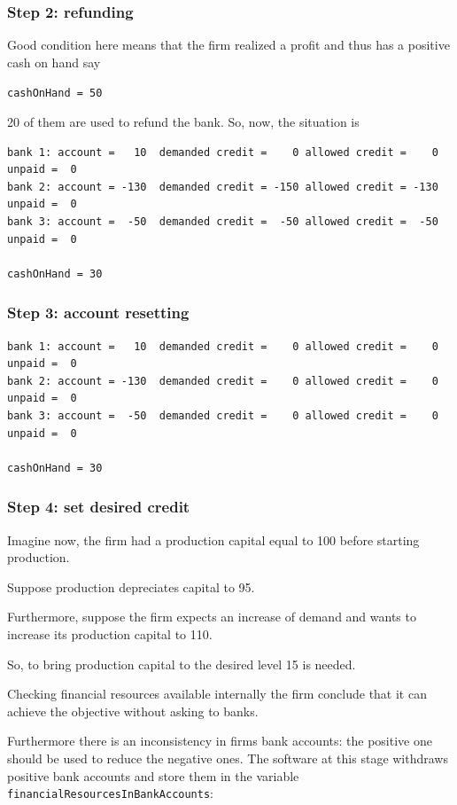 \documentclass{article}
\begin{document}
	\subsubsection*{Step 2: refunding}
	Good condition here means that the firm realized a profit and thus has a positive cash on hand say

	\verb+cashOnHand = 50+

20 of them are used to refund the bank. So, now, the situation is 

\begin{verbatim}
bank 1: account =   10  demanded credit =    0 allowed credit =    0 unpaid =  0
bank 2: account = -130  demanded credit = -150 allowed credit = -130 unpaid =  0
bank 3: account =  -50  demanded credit =  -50 allowed credit =  -50 unpaid =  0

cashOnHand = 30
\end{verbatim}



	\subsubsection*{Step 3: account resetting}

\begin{verbatim}
bank 1: account =   10  demanded credit =    0 allowed credit =    0 unpaid =  0
bank 2: account = -130  demanded credit =    0 allowed credit =    0 unpaid =  0
bank 3: account =  -50  demanded credit =    0 allowed credit =    0 unpaid =  0

cashOnHand = 30
\end{verbatim}

	\subsubsection*{Step 4: set desired credit}
	Imagine now, the firm had a production capital equal to 100 before starting production. 
	
	Suppose production depreciates capital to 95.

	Furthermore, suppose the firm expects an increase of demand and wants to increase its production capital to 110.

	So, to bring production capital to the desired level 15 is needed.

	Checking financial resources available internally the firm conclude that it can achieve the objective without asking to banks. 

	Furthermore there is an inconsistency in firms bank accounts: the positive one should be used to reduce the negative ones. The software at this stage withdraws positive bank accounts and store them in the variable \verb+financialResourcesInBankAccounts+:
\end{document}
